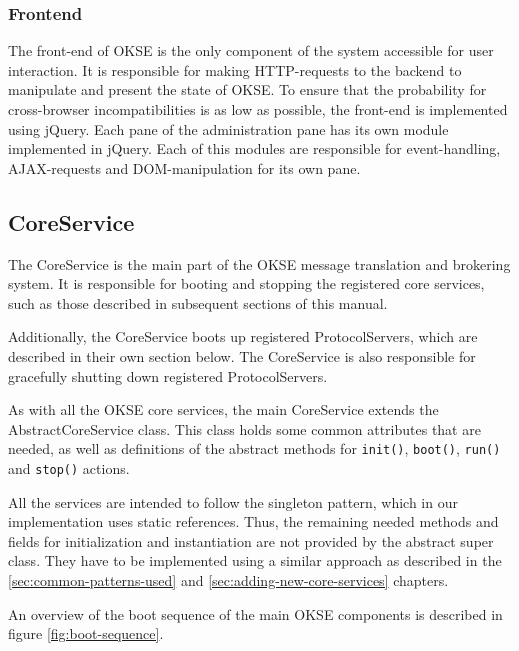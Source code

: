 \subsubsection{Frontend}

The front-end of OKSE is the only component of the system accessible for user interaction. It is responsible for making HTTP-requests to the backend to manipulate and present the state of OKSE. To ensure that the probability for cross-browser incompatibilities is as low as possible, the front-end is implemented using jQuery. Each pane of the administration pane has its own module implemented in jQuery. Each of this modules are responsible for event-handling, AJAX-requests and DOM-manipulation for its own pane. 

\subsection{CoreService}

The CoreService is the main part of the OKSE message translation and brokering system. It is responsible for booting and stopping the registered core services, such as those described in subsequent sections of this manual.

Additionally, the CoreService boots up registered ProtocolServers, which are described in their own section below. The CoreService is also responsible for gracefully shutting down registered ProtocolServers.

As with all the OKSE core services, the main CoreService extends the AbstractCoreService class. This class holds some common attributes that are needed, as well as definitions of the abstract methods for \verb!init()!, \verb!boot()!, \verb!run()! and \verb!stop()! actions.

All the services are intended to follow the singleton pattern, which in our implementation uses static references. Thus, the remaining needed methods and fields for initialization and instantiation are not provided by the abstract super class. They have to be implemented using a similar approach as described in the \ref{sec:common-patterns-used} and \ref{sec:adding-new-core-services} chapters.

An overview of the boot sequence of the main OKSE components is described in figure \ref{fig:boot-sequence}.


